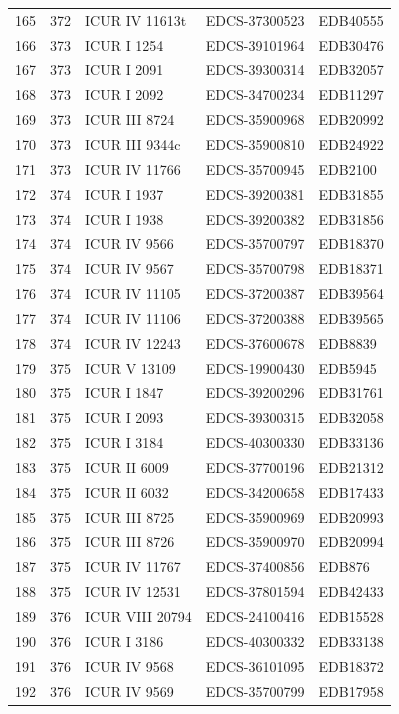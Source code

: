\begin{longtable}{@{}r r l l l@{}}
165 & 372 & ICUR IV 11613t & EDCS-37300523 & EDB40555 \\
166 & 373 & ICUR I 1254 & EDCS-39101964 & EDB30476 \\
167 & 373 & ICUR I 2091 & EDCS-39300314 & EDB32057 \\
168 & 373 & ICUR I 2092 & EDCS-34700234 & EDB11297 \\
169 & 373 & ICUR III 8724 & EDCS-35900968 & EDB20992 \\
170 & 373 & ICUR III 9344c & EDCS-35900810 & EDB24922 \\
171 & 373 & ICUR IV 11766 & EDCS-35700945 & EDB2100 \\
172 & 374 & ICUR I 1937 & EDCS-39200381 & EDB31855 \\
173 & 374 & ICUR I 1938 & EDCS-39200382 & EDB31856 \\
174 & 374 & ICUR IV 9566 & EDCS-35700797 & EDB18370 \\
175 & 374 & ICUR IV 9567 & EDCS-35700798 & EDB18371 \\
176 & 374 & ICUR IV 11105 & EDCS-37200387 & EDB39564 \\
177 & 374 & ICUR IV 11106 & EDCS-37200388 & EDB39565 \\
178 & 374 & ICUR IV 12243 & EDCS-37600678 & EDB8839 \\
179 & 375 & ICUR V 13109 & EDCS-19900430 & EDB5945 \\
180 & 375 & ICUR I 1847 & EDCS-39200296 & EDB31761 \\
181 & 375 & ICUR I 2093 & EDCS-39300315 & EDB32058 \\
182 & 375 & ICUR I 3184 & EDCS-40300330 & EDB33136 \\
183 & 375 & ICUR II 6009 & EDCS-37700196 & EDB21312 \\
184 & 375 & ICUR II 6032 & EDCS-34200658 & EDB17433 \\
185 & 375 & ICUR III 8725 & EDCS-35900969 & EDB20993 \\
186 & 375 & ICUR III 8726 & EDCS-35900970 & EDB20994 \\
187 & 375 & ICUR IV 11767 & EDCS-37400856 & EDB876 \\
188 & 375 & ICUR IV 12531 & EDCS-37801594 & EDB42433 \\
189 & 376 & ICUR VIII 20794 & EDCS-24100416 & EDB15528 \\
190 & 376 & ICUR I 3186 & EDCS-40300332 & EDB33138 \\
191 & 376 & ICUR IV 9568 & EDCS-36101095 & EDB18372 \\
192 & 376 & ICUR IV 9569 & EDCS-35700799 & EDB17958 \\

\end{longtable}
